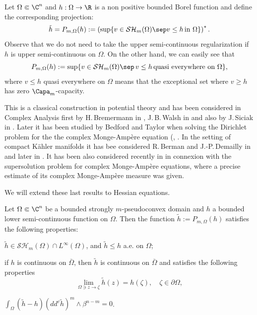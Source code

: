 Let $\Omega \Subset \C^n$ and $h: \Omega \to \R$ is a non positive bounded Borel function and define the corresponding projection:
\begin{equation} \label{eq:subextension}
\tilde h = P_{m,\Omega} (h):= \left(\sup \{v \in \mathcal {SH}_m (\Omega) \sep v \leq h \, \text{in} \, \, \Omega\}\right)^*.
\end{equation}
Observe that we do not need to take the upper semi-continuous regularization if $h$ is upper semi-continuous on $\Omega$. On the other hand, we can easily see that
\[
P_{m,\Omega} (h):= \sup \{v \in \mathcal {SH}_m (\Omega) \sep \, v \leq h \, \text{quasi everywhere on} \, \, \Omega\},
\]
where $v \leq h$ quasi everywhere on $\Omega$ means that the exceptional set where $v \geq h$ has zero $\Capa_m$-capacity.

This is a classical construction in potential theory and has been considered in Complex Analysis first by H.\,Bremermann in \cite{Brem59}, J.\,B.\,Walsh in \cite{Wal69} and also by J.\,Siciak in \cite{Sic81}. Later it has been studied by Bedford and Taylor when solving the Dirichlet problem for the the complex Monge-Ampère equation (\cite{BT76}, \cite{BT82}. In the setting of compact Kähler manifolds it has bee considered R.\,Berman and J.-P.\,Demailly in \cite{BD12} and later in \cite{Ber19}. It has been also considered recently in \cite{GLZ19} in connexion with the supersolution problem for complex Monge-Ampère equations, where a precise estimate of its complex Monge-Ampère measure was given.

We will extend these last results to Hessian equations.

\begin{lemma} \label{lem:projection} Let $\Omega \Subset \C^n$ be a bounded strongly $m$-pseudoconvex domain and $h$ a bounded lower semi-continuous function on $\Omega$. Then the function $\tilde h:= P_{m,\Omega} (h)$ satisfies the following properties:
\begin{enumeratei}
\item\label{lem:projectioni}
$\tilde h \in \mathcal {SH}_m (\Omega) \cap L^{\infty} (\Omega)$, and $\tilde h \leq h$ a.e. on $\Omega$;

\item\label{lem:projectionii}
if $h$ is continuous on $\bar \Omega$, then $\tilde h$ is continuous on $\bar{\Omega}$ and satisfies the following properties
\begin{equation} \label{eq:boundaryvaluesh}
\lim_{\Omega \ni z \to \zeta} \tilde h (z) = h (\zeta), \quad \zeta \in \partial \Omega,
\end{equation}

\item\label{lem:projectioniii}
$ \int_\Omega (\tilde h - h) (dd^c \tilde h)^m \wedge \beta^{n - m} = 0$.
\end{enumeratei}
\end{lemma}

